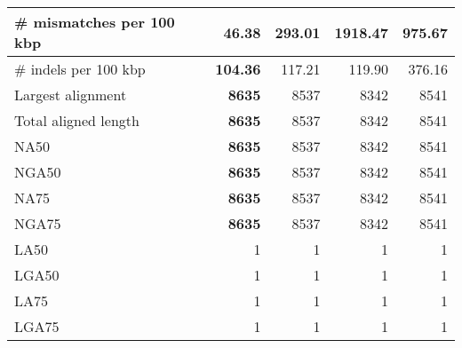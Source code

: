 \documentclass[12pt,a4paper]{article}
\begin{document}
\begin{table}[ht]
\begin{center}
\begin{tabular}{|l*{4}{|r}|}
\# mismatches per 100 kbp & {\bf 46.38} & 293.01 & 1918.47 & 975.67 \\ \hline
\# indels per 100 kbp & {\bf 104.36} & 117.21 & 119.90 & 376.16 \\ \hline
Largest alignment & {\bf 8635} & 8537 & 8342 & 8541 \\ \hline
Total aligned length & {\bf 8635} & 8537 & 8342 & 8541 \\ \hline
NA50 & {\bf 8635} & 8537 & 8342 & 8541 \\ \hline
NGA50 & {\bf 8635} & 8537 & 8342 & 8541 \\ \hline
NA75 & {\bf 8635} & 8537 & 8342 & 8541 \\ \hline
NGA75 & {\bf 8635} & 8537 & 8342 & 8541 \\ \hline
LA50 & 1 & 1 & 1 & 1 \\ \hline
LGA50 & 1 & 1 & 1 & 1 \\ \hline
LA75 & 1 & 1 & 1 & 1 \\ \hline
LGA75 & 1 & 1 & 1 & 1 \\ \hline
\end{tabular}
\end{center}
\end{table}
\end{document}
